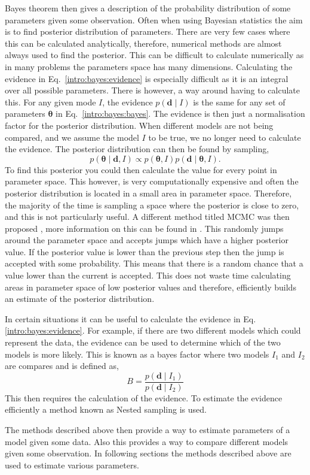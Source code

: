 Bayes theorem then gives a description of the probability distribution of some parameters given some observation.
Often when using Bayesian statistics the aim is to find posterior distribution of parameters.
There are very few cases where this can be calculated analytically, therefore, numerical methods are almost always used to find the posterior.
This can be difficult to calculate numerically as in many problems the parameters space has many dimensions.
Calculating the evidence in Eq.~\ref{intro:bayes:evidence} is especially difficult as it is an integral over all possible parameters.
There is however, a way around having to calculate this. For any given mode $I$, the evidence $p({\bm d}\mid I)$ is the same for any set of parameters ${\bm \theta}$ in Eq.~\ref{intro:bayes:bayes}. 
The evidence is then just a normalisation factor for the posterior distribution. 
When different models are not being compared, and we assume the model $I$ to be true, we no longer need to calculate the evidence.
The posterior distribution can then be found by sampling,
\begin{equation}
    p({\bm \theta} \mid {\bm d}, I) \propto p({\bm \theta}, I)p({\bm d} \mid {\bm \theta}, I).
\end{equation}
To find this posterior you could then calculate the value for every point in parameter space. This however, is very computationally expensive and often the posterior distribution is located in a small area in parameter space. 
Therefore, the majority of the time is sampling a space where the posterior is close to zero, and this is not particularly useful. 
A different method titled \ac{MCMC} was then proposed \citep{metropolis1953EquationState}, more information on this can be found in \citep{vanravenzwaaij2018SimpleIntroduction,sharma2017MarkovChain}.
This randomly jumps around the parameter space and accepts jumps which have a higher posterior value. 
If the posterior value is lower than the previous step then the jump is accepted with some probability. This means that there is a random chance that a value lower than the current is accepted.
This does not waste time calculating areas in parameter space of low posterior values and therefore, efficiently builds an estimate of the posterior distribution.

In certain situations it can be useful to calculate the evidence in Eq.\ref{intro:bayes:evidence}. 
For example, if there are two different models which could represent the data, the evidence can be used to determine which of the two models is more likely.
This is known as a bayes factor where two models $I_1$ and $I_2$ are compares and is defined as,
\begin{equation}
    B = \frac{p({\bm d} \mid I_1)}{p({\bm d} \mid I_2)}
\end{equation}
This then requires the calculation of the evidence.
To estimate the evidence efficiently a method known as Nested sampling \citep{skilling2006NestedSampling,speagle2019DynestyDynamic} is used.

The methods described above then provide a way to estimate parameters of a model given some data. 
Also this provides a way to compare different models given some observation.
In following sections the methods described above are used to estimate various parameters.





